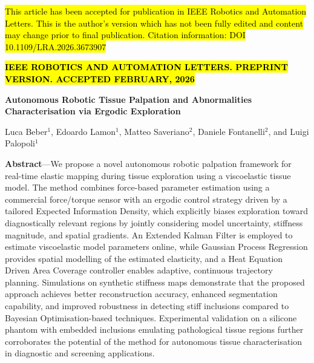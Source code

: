 \documentclass[11pt]{article}
\begin{document}
\setcounter{equation}{0}

\begin{center}
\footnotesize
{}\hl{This article has been accepted for publication in IEEE Robotics and
Automation Letters. This is the author's version which has not been
fully edited and content may change prior to final publication.
Citation information: DOI 10.1109/LRA.2026.3673907}

\vspace{0.3em}
\textbf{\hl{IEEE ROBOTICS AND AUTOMATION LETTERS. PREPRINT VERSION.
ACCEPTED FEBRUARY, 2026}}
\end{center}

\vspace{1em}

\begin{center}
{\Large\bfseries Autonomous Robotic Tissue Palpation and Abnormalities
Characterisation via Ergodic Exploration}

\vspace{0.8em}

{\normalsize Luca Beber$^{1}$, Edoardo Lamon$^{1}$,
Matteo Saveriano$^{2}$, Daniele Fontanelli$^{2}$, and
Luigi Palopoli$^{1}$}
\end{center}

\vspace{0.8em}

\noindent\textbf{Abstract}---We propose a novel autonomous robotic
palpation framework for real-time elastic mapping during tissue
exploration using a viscoelastic tissue model. The method combines
force-based parameter estimation using a commercial force/torque
sensor with an ergodic control strategy driven by a tailored Expected
Information Density, which explicitly biases exploration toward
diagnostically relevant regions by jointly considering model
uncertainty, stiffness magnitude, and spatial gradients. An Extended
Kalman Filter is employed to estimate viscoelastic model parameters
online, while Gaussian Process Regression provides spatial modelling
of the estimated elasticity, and a Heat Equation Driven Area Coverage
controller enables adaptive, continuous trajectory planning.
Simulations on synthetic stiffness maps demonstrate that the proposed
approach achieves better reconstruction accuracy, enhanced
segmentation capability, and improved robustness in detecting stiff
inclusions compared to Bayesian Optimisation-based techniques.
Experimental validation on a silicone phantom with embedded inclusions
emulating pathological tissue regions further corroborates the
potential of the method for autonomous tissue characterisation in
diagnostic and screening applications.
\end{document}
